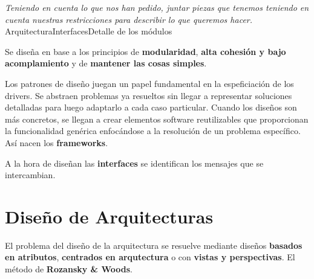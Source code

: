 \begin{center}
  \textit{Teniendo en cuenta lo que nos han pedido, juntar piezas que
    tenemos teniendo en cuenta nuestras restricciones para describir lo que queremos
    hacer.}
  Arquitectura\textrightarrow Interfaces\textrightarrow Detalle de los módulos
\end{center}

Se diseña en base a los principios de \textbf{modularidad},
\textbf{alta cohesión y bajo acomplamiento} y de \textbf{mantener las
  cosas simples}.

Los patrones de diseño juegan un papel fundamental en la espeficiación
de los drivers. Se abstraen problemas ya
resueltos sin llegar a representar soluciones detalladas para luego
adaptarlo a cada caso particular. Cuando los diseños son más
concretos, se llegan a crear elementos software reutilizables que
proporcionan la funcionalidad genérica enfocándose a la resolución de
un problema específico. Así nacen los \textbf{frameworks}.

A la hora de diseñan las \textbf{interfaces} se identifican los
mensajes que se intercambian.

\section{Diseño de Arquitecturas}
\label{sec:arquitectura:diseñoarquitectura}

El problema del diseño de la arquitectura se resuelve mediante diseños
\textbf{basados en atributos}, \textbf{centrados en arqutectura} o con
\textbf{vistas y perspectivas}. El método de \textbf{Rozansky \&
  Woods}.


